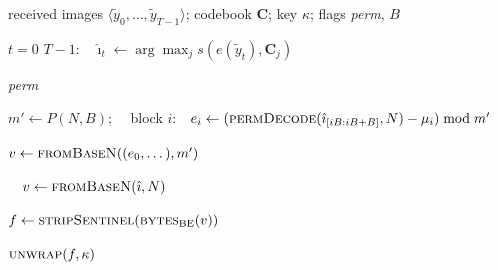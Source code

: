 \begin{algorithm}[t]
\caption{\textsc{Decode}: image sequence $\to$ message}\label{alg:decode}
\begin{pseudo}
\item {} received images $\langle\tilde y_0,\dots,\tilde y_{T-1}\rangle$;
      codebook $\mathbf{C}$; key $\kappa$; flags \textit{perm}, $B$
\item {} $t=0$  $T-1$:\ \ $\hat\imath_t\gets\arg\max_j s(e(\tilde y_t),\mathbf{C}_j)$ 
\item {} \textit{perm} 
\item \Ind $m'\gets P(N,B)$;\ \  block $i$:\ \ $e_i\gets(\textsc{permDecode}(\hat\imath_{[iB:iB+B]},N)-\mu_i)\bmod m'$
\item \Ind $v\gets\textsc{fromBaseN}((e_0,\dots),m')$
\item {}\ \ $v\gets\textsc{fromBaseN}(\hat\imath,N)$
\item $f\gets\textsc{stripSentinel}(\textsc{bytes}_{\mathrm{BE}}(v))$ 
\item {} $\textsc{unwrap}(f,\kappa)$ 
\end{pseudo}
\end{algorithm}
